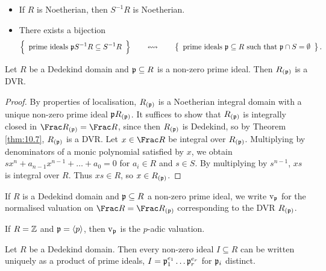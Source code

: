 \begin{fact*}
\hfill
\begin{itemize}
\item If $ R $ is Noetherian, then $ S^{-1}R $ is Noetherian.
\item There exists a bijection
$$ \correspondence{\text{prime ideals} \ \ppp S^{-1}R \subseteq S^{-1}R}{\text{prime ideals} \ \ppp \subseteq R \ \text{such that} \ \ppp \cap S = \emptyset}. $$
\end{itemize}
\end{fact*}

\begin{corollary}
\label{cor:11.1}
Let $ R $ be a Dedekind domain and $ \mathfrak{p} \subseteq R $ is a non-zero prime ideal. Then $ R_{\br{\ppp}} $ is a DVR.
\end{corollary}

\begin{proof}
By properties of localisation, $ R_{\br{\ppp}} $ is a Noetherian integral domain with a unique non-zero prime ideal $ \ppp R_{\br{\ppp}} $. It suffices to show that $ R_{\br{\ppp}} $ is integrally closed in $ \Frac R_{\br{\ppp}} = \Frac R $, since then $ R_{\br{\ppp}} $ is Dedekind, so by Theorem \ref{thm:10.7}, $ R_{\br{\ppp}} $ is a DVR. Let $ x \in \Frac R $ be integral over $ R_{\br{\ppp}} $. Multiplying by denominators of a monic polynomial satisfied by $ x $, we obtain $ sx^n + a_{n - 1}x^{n - 1} + \dots + a_0 = 0 $ for $ a_i \in R $ and $ s \in S $. By multiplying by $ s^{n - 1} $, $ xs $ is integral over $ R $. Thus $ xs \in R $, so $ x \in R_{\br{\ppp}} $.
\end{proof}

\begin{definition}
If $ R $ is a Dedekind domain and $ \mathfrak{p} \subseteq R $ a non-zero prime ideal, we write $ \mathrm{v}_{\mathfrak{p}} $ for the normalised valuation on $ \Frac R = \Frac R_{\br{\ppp}} $ corresponding to the DVR $ R_{\br{\ppp}} $.
\end{definition}

\begin{example*}
If $ R = \mathbb{Z} $ and $ \mathfrak{p} = \left\langle p \right\rangle $, then $ \mathrm{v}_{\mathfrak{p}} $ is the $ p $-adic valuation.
\end{example*}

\begin{theorem}
Let $ R $ be a Dedekind domain. Then every non-zero ideal $ I \subseteq R $ can be written uniquely as a product of prime ideals, $ I = \mathfrak{p}_1^{e_1} \dots \mathfrak{p}_r^{e_r} $ for $ \mathfrak{p}_i $ distinct.
\end{theorem}

